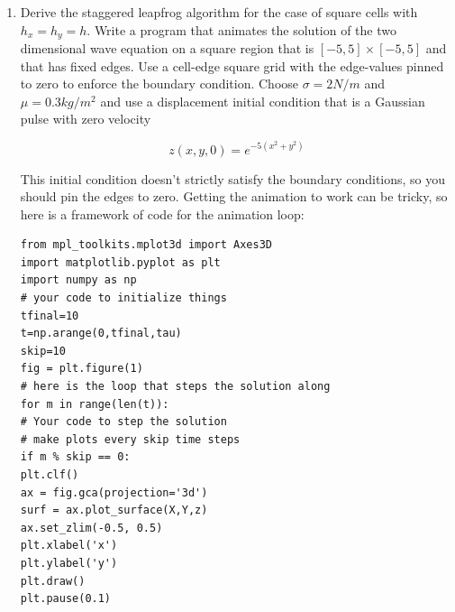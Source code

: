 \documentclass{book}
\theoremstyle{plain}
\theoremstyle{definition}
\numberwithin{exm}{chapter}
\theoremstyle{remark}
\theoremstyle{summary}
\theoremstyle{overview}
\begin{document}
\begin{enumerate}[label=(\alph*)]
	\item Derive the staggered leapfrog algorithm for the case of square cells
with $h_x = h_y = h$. Write a program that animates the solution of the
two dimensional wave equation on a square region that is $[−5,5] ×
[−5,5]$ and that has fixed edges. Use a cell-edge square grid with
the edge-values pinned to zero to enforce the boundary condition.
Choose $\sigma = 2 N/m$ and $ \mu = 0.3 kg/m^2$
and use a displacement initial
condition that is a Gaussian pulse with zero velocity

\begin{equation}\label{eq:67}
z(x,y,0) = e^{-5(x^2+y^2)}
\end{equation}

This initial condition doesn\rq t strictly satisfy the boundary conditions,
so you should pin the edges to zero.
Getting the animation to work can be tricky, so here is a framework of
code for the animation loop:
\begin{lstlisting}
from mpl_toolkits.mplot3d import Axes3D
import matplotlib.pyplot as plt
import numpy as np
# your code to initialize things
tfinal=10
t=np.arange(0,tfinal,tau)
skip=10
fig = plt.figure(1)
# here is the loop that steps the solution along
for m in range(len(t)):
# Your code to step the solution
# make plots every skip time steps
if m % skip == 0:
plt.clf()
ax = fig.gca(projection='3d')
surf = ax.plot_surface(X,Y,z)
ax.set_zlim(-0.5, 0.5)
plt.xlabel('x')
plt.ylabel('y')
plt.draw()
plt.pause(0.1)
\end{lstlisting}

\end{enumerate}
\end{document}
